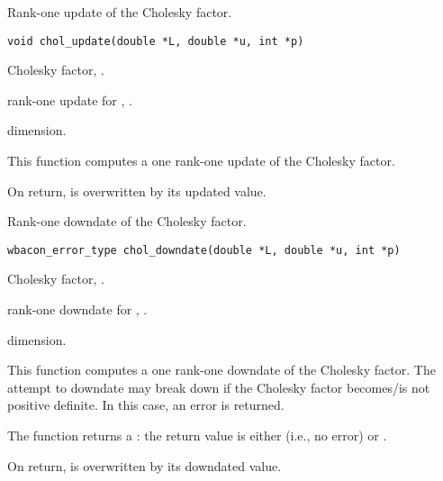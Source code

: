 \documentclass[a4paper,oneside,10pt,DIV=12]{scrartcl}
\begin{document}
\begin{Description}
Rank-one update of the Cholesky factor.
\end{Description}
\begin{Usage}
\begin{verbatim}
void chol_update(double *L, double *u, int *p)
\end{verbatim}
\end{Usage}
\begin{Arguments}
	\begin{ldescription}
		\item[\code{L}] Cholesky factor, .
		\item[\code{u}] rank-one update for ,
			.
		\item[\code{p}] dimension.
	\end{ldescription}
\end{Arguments}
\begin{Details}
This function computes a one rank-one update of the Cholesky factor.
\end{Details}
\begin{Value}
On return,  is overwritten by its updated value.
\end{Value}

\begin{Description}
Rank-one downdate of the Cholesky factor.
\end{Description}
\begin{Usage}
\begin{verbatim}
wbacon_error_type chol_downdate(double *L, double *u, int *p)
\end{verbatim}
\end{Usage}
\begin{Arguments}
	\begin{ldescription}
		\item[\code{L}] Cholesky factor, \code{double array[p, p]}.
		\item[\code{u}] rank-one downdate for \code{L},
			\code{double array[p]}.
		\item[\code{p}] dimension.
	\end{ldescription}
\end{Arguments}
\begin{Details}
This function computes a one rank-one downdate of the Cholesky factor. The
attempt to downdate may break down if the Cholesky factor becomes/is not
positive definite. In this case, an error is returned.
\end{Details}
\begin{Value}
The function returns a :
the return value is either  (i.e., no error) or
.

On return,  is overwritten by its downdated value.
\end{Value}
\end{document}
